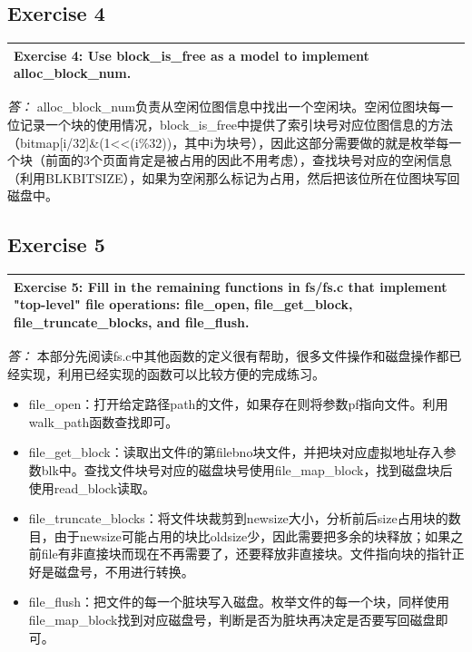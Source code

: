 \documentclass[11pt,a4paper]{article}
\newcommand{\exercise}[2]{
\begin{tabular}{|p{\textwidth}|}
\hline
#1: #2\\
\hline
\end{tabular}
\textit{\large{答：}}}
\begin{document}
\subsection{Exercise 4}
\exercise{Exercise 4}{Use block\_is\_free as a model to implement alloc\_block\_num.}
alloc\_block\_num负责从空闲位图信息中找出一个空闲块。空闲位图块每一位记录一个块的使用情况，block\_is\_free中提供了索引块号对应位图信息的方法（bitmap[i/32]\&(1<<(i\%32))，其中i为块号），因此这部分需要做的就是枚举每一个块（前面的3个页面肯定是被占用的因此不用考虑），查找块号对应的空闲信息（利用BLKBITSIZE），如果为空闲那么标记为占用，然后把该位所在位图块写回磁盘中。\\

\subsection{Exercise 5}
\exercise{Exercise 5}{Fill in the remaining functions in fs/fs.c that implement "top-level" file operations: file\_open, file\_get\_block, file\_truncate\_blocks, and file\_flush.}
本部分先阅读fs.c中其他函数的定义很有帮助，很多文件操作和磁盘操作都已经实现，利用已经实现的函数可以比较方便的完成练习。\\
\begin{itemize}
\item file\_open：打开给定路径path的文件，如果存在则将参数pf指向文件。利用walk\_path函数查找即可。
\item file\_get\_block：读取出文件f的第filebno块文件，并把块对应虚拟地址存入参数blk中。查找文件块号对应的磁盘块号使用file\_map\_block，找到磁盘块后使用read\_block读取。
\item file\_truncate\_blocks：将文件块裁剪到newsize大小，分析前后size占用块的数目，由于newsize可能占用的块比oldsize少，因此需要把多余的块释放；如果之前file有非直接块而现在不再需要了，还要释放非直接块。文件指向块的指针正好是磁盘号，不用进行转换。
\item file\_flush：把文件的每一个脏块写入磁盘。枚举文件的每一个块，同样使用file\_map\_block找到对应磁盘号，判断是否为脏块再决定是否要写回磁盘即可。
\end{itemize}
\end{document}
